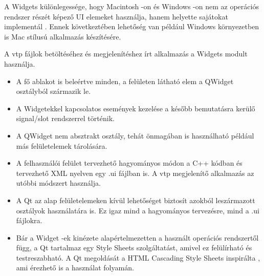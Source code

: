 A Widgets különlegessége, hogy Macintosh -on és Windows -on nem 
az operációs rendszer részét képező UI elemeket használja, 
hanem helyette sajátokat implementál \cite{qtdocumentation}. 
Ennek következtében lehetőség van például 
Windows környezetben is Mac stílusú alkalmazás készítésére.

A vtp fájlok betöltéséhez és megjelenítéshez írt 
alkalmazás a Widgets modult használja.

\vspace{2mm}


\vspace{2mm}

\begin{itemize}
\item 
A fő ablakot is beleértve minden, 
a felületen látható elem a QWidget osztályból származik le.
\item 
A Widgetekkel kapcsolatos események kezelése 
a később bemutatásra kerülő signal/slot rendszerrel történik. 
\item
A QWidget nem absztrakt osztály, 
tehát önmagában is használható például más felületelemek tárolására.
\item
A felhasználói felület tervezhető hagyományos módon
a C++ kódban
és tervezhető XML nyelven egy .ui fájlban is. 
A vtp megjelenítő alkalmazás az utóbbi módszert használja.
\item 
A Qt az alap felületelemeken kívül lehetőséget 
biztosít azokból leszármazott osztályok használatára is. 
Ez igaz mind a hagyományos tervezésre, mind a .ui fájlokra.
\item
Bár a Widget -ek kinézete alapértelmezetten 
a használt operációs rendszertől függ, 
a Qt tartalmaz egy Style Sheets szolgáltatást, 
amivel ez felülírható és testreszabható. 
A Qt megoldását 
a HTML Cascading Style Sheets inspirálta \cite{qtdocumentation}, 
ami érezhető is a használat folyamán.
\end{itemize}

\vspace{2mm}


\vspace{2mm}

